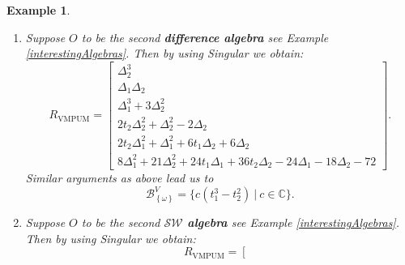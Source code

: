 \documentclass[a4paper,10pt]{article}
\newtheorem{ex}[Th]{Example}
\theoremstyle{nonumberplain}
\newcommand{\C}{\mathbb{C}}
\DeclareMathOperator{\VMPUM}{VMPUM}
\begin{document}
\begin{ex}
\begin{enumerate}
\begin{enumerate}
\item $\partial_1 \partial_2 \bullet f = 0 \;\; \Rightarrow \;\; \partial_1\bullet c_1 + 2 t_2 \partial_1 \bullet c_2=0 
       \;\; \Rightarrow \;\; \partial_1\bullet c_1 =0  \; \wedge \; \partial_1\bullet c_2 =0$
      $  \Rightarrow \;\; c_1, c_2 \in \C $.
\item $ (\partial_1^3 + 3 \partial_2^2) \bullet f=0 \;\; \Rightarrow \;\; 
        \partial_1^3 \bullet c_0 +6 c_2=0 \;\; \Rightarrow \;\; 
        c_0 = -c_2 t_1^3 + d_2t_1^2 + d_1 t_1 +d_0, \;$ where $ d_i \in \C$.
\item $(t_2 \partial_2^2-\partial_2) \bullet f=0 \;\; \Rightarrow \;\; c_1=0 $.
\item $(3 t_1 \partial_2+t_2 \partial_1^2) \bullet f=0 \;\; \Rightarrow \;\;
       d_2=0$. 
\item $(2 t_1 \partial_1+3 t_2 \partial_2-6) \bullet f = 0 \;\; \Rightarrow \;\; 
       -4d_1t_1-6d_0 = 0 \;\; \Rightarrow \;\;d_1=0=d_0$.
\end{enumerate}
Hence, we obtain that $f=c(t_1^3 - t_2^2)$, thus 
$$ \mathcal{B}_{\left\lbrace \omega \right\rbrace }^V= \{ c (t_1^3 - t_2^2) \ | \ c\in \C \}.$$
With respect to the requirement of being most powerful and linear, 
the $\VMPUM$ is as significant as possible.
We observe that the $\VMPUM$ of a single non-zero 
signal has $\C$-dimension one. 
Actually, this holds in general, as will be shown in Theorem
\ref{CDimension}.
\item  Suppose $O$ to be the second \textbf{difference algebra} see Example \ref{interestingAlgebras}. Then
by using {\sc Singular} we obtain: 
$$R_{\VMPUM} = 
\left[ \begin{array}{c} \Delta_2^3\\
\Delta_1 \Delta_2\\
\Delta_1^3+3 \Delta_2^2\\
2 t_2 \Delta_2^2+\Delta_2^2-2 \Delta_2\\
2 t_2 \Delta_1^2+\Delta_1^2+6 t_1 \Delta_2+6 \Delta_2\\
8 \Delta_1^2 +21 \Delta_2^2 + 24 t_1 \Delta_1+36 t_2 \Delta_2-24 \Delta_1-18 \Delta_2-72
\end{array} \right]. $$ 
Similar arguments as above lead us to
$$\mathcal{B}_{\left\lbrace \omega \right\rbrace }^V= \{ c (t_1^3 - t_2^2) \ | \ c\in \C \}.$$
\item Suppose $O$ to be the second \textbf{$\mathcal{SW}$ algebra} see Example \ref{interestingAlgebras}. Then
by using {\sc Singular} we obtain:
$$
R_{\VMPUM} = 
\left[ \begin{array}{c}

\end{array}$$
\end{enumerate}
\end{ex}
\end{document}
